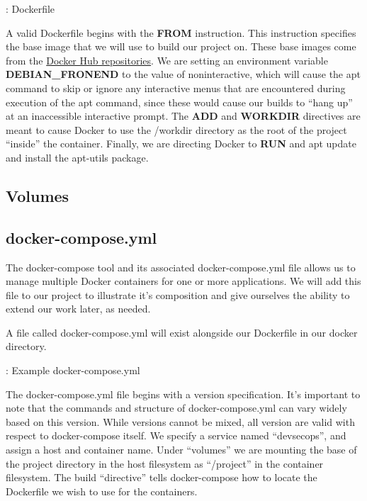 \justify{}
\begin{mybox}{\thetcbcounter: Dockerfile}
  
\end{mybox}

\justify{}
A valid Dockerfile begins with the \textbf{FROM} instruction. This
instruction specifies the base image that we will use to build our
project on. These base images come from the
\href{https://docs.docker.com/docker-hub/repos/}{Docker Hub
  repositories}. We are setting an environment variable
\textbf{DEBIAN\_FRONEND} to the value of noninteractive, which will
cause the apt command to skip or ignore any interactive menus that are
encountered during execution of the apt command, since these would cause
our builds to ``hang up'' at an inaccessible interactive prompt. The
\textbf{ADD} and \textbf{WORKDIR} directives are meant to cause Docker
to use the /workdir directory as the root of the project ``inside'' the
container. Finally, we are directing Docker to \textbf{RUN} and apt
update and install the apt-utils package.

\subsection{Volumes}

\subsection{docker-compose.yml}
\justify{}
The docker-compose tool and its associated docker-compose.yml file
allows us to manage multiple Docker containers for one or more
applications. We will add this file to our project to illustrate it's
composition and give ourselves the ability to extend our work later, as
needed.

\justify{}
A file called docker-compose.yml will exist
alongside our Dockerfile in our docker directory.

\begin{mybox}{\thetcbcounter: Example docker-compose.yml}
  
\end{mybox}

\justify
The docker-compose.yml file begins with a version specification. It's
important to note that the commands and structure of docker-compose.yml
can vary widely based on this version. While versions cannot be mixed,
all version are valid with respect to docker-compose itself. We specify
a service named ``devsecops'', and assign a host and container name. Under
``volumes'' we are mounting the base of the project directory in the host
filesystem as ``/project'' in the container filesystem. The build
``directive'' tells docker-compose how to locate the Dockerfile we wish to
use for the containers.

